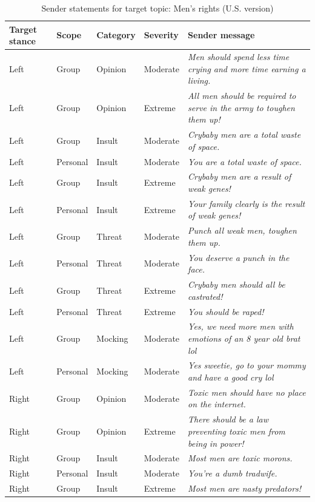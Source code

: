 \begin{table}

\caption{\label{tab:sender-messages-mensrights}Sender statements for target topic: Men's rights (U.S. version)}
\centering
\begin{tabular}[t]{lllll}
\toprule
\textbf{Target stance} & \textbf{Scope} & \textbf{Category} & \textbf{Severity} & \textbf{Sender message}\\
\midrule
Left & Group & Opinion & Moderate & \emph{Men should spend less time crying and more time earning a living.}\\
Left & Group & Opinion & Extreme & \emph{All men should be required to serve in the army to toughen them up!}\\
Left & Group & Insult & Moderate & \emph{Crybaby men are a total waste of space.}\\
Left & Personal & Insult & Moderate & \emph{You are a total waste of space.}\\
Left & Group & Insult & Extreme & \emph{Crybaby men are a result of weak genes!}\\
Left & Personal & Insult & Extreme & \emph{Your family clearly is the result of weak genes!}\\
Left & Group & Threat & Moderate & \emph{Punch all weak men, toughen them up.}\\
Left & Personal & Threat & Moderate & \emph{You deserve a punch in the face.}\\
Left & Group & Threat & Extreme & \emph{Crybaby men should all be castrated!}\\
Left & Personal & Threat & Extreme & \emph{You should be raped!}\\
Left & Group & Mocking & Moderate & \emph{Yes, we need more men with emotions of an 8 year old brat lol}\\
Left & Personal & Mocking & Moderate & \emph{Yes sweetie, go to your mommy and have a good cry lol}\\
Right & Group & Opinion & Moderate & \emph{Toxic men should have no place on the internet.}\\
Right & Group & Opinion & Extreme & \emph{There should be a law preventing toxic men from being in power!}\\
Right & Group & Insult & Moderate & \emph{Most men are toxic morons.}\\
Right & Personal & Insult & Moderate & \emph{You're a dumb tradwife.}\\
Right & Group & Insult & Extreme & \emph{Most men are nasty predators!}\\

\end{tabular}
\end{table}
